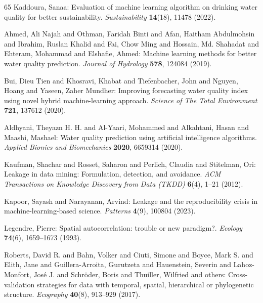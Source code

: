 \documentclass[pdflatex,sn-mathphys-num]{sn-jnl}%
\theoremstyle{thmstyleone}%
\theoremstyle{thmstyletwo}%
\theoremstyle{thmstylethree}%
\begin{document}
\begin{thebibliography}{65}
Kaddoura, Sanaa: Evaluation of machine learning algorithm on drinking water quality for better sustainability.
\textit{Sustainability} \textbf{14}(18), 11478 (2022).

Ahmed, Ali Najah and Othman, Faridah Binti and Afan, Haitham Abdulmohsin and Ibrahim, Ruslan Khalid and Fai, Chow Ming and Hossain, Md. Shahadat and Ehteram, Mohammad and Elshafie, Ahmed: Machine learning methods for better water quality prediction.
\textit{Journal of Hydrology} \textbf{578}, 124084 (2019).

Bui, Dieu Tien and Khosravi, Khabat and Tiefenbacher, John and Nguyen, Hoang and Yaseen, Zaher Mundher: Improving forecasting water quality index using novel hybrid machine-learning approach.
\textit{Science of The Total Environment} \textbf{721}, 137612 (2020).

Aldhyani, Theyazn H. H. and Al-Yaari, Mohammed and Alkahtani, Hasan and Maashi, Mashael: Water quality prediction using artificial intelligence algorithms.
\textit{Applied Bionics and Biomechanics} \textbf{2020}, 6659314 (2020).

Kaufman, Shachar and Rosset, Saharon and Perlich, Claudia and Stitelman, Ori: Leakage in data mining: Formulation, detection, and avoidance.
\textit{ACM Transactions on Knowledge Discovery from Data (TKDD)} \textbf{6}(4), 1--21 (2012).

Kapoor, Sayash and Narayanan, Arvind: Leakage and the reproducibility crisis in machine-learning-based science.
\textit{Patterns} \textbf{4}(9), 100804 (2023).

Legendre, Pierre: Spatial autocorrelation: trouble or new paradigm?.
\textit{Ecology} \textbf{74}(6), 1659--1673 (1993).

Roberts, David R. and Bahn, Volker and Ciuti, Simone and Boyce, Mark S. and Elith, Jane and Guillera-Arroita, Gurutzeta and Hauenstein, Severin and Lahoz-Monfort, Jos{\'e} J. and Schr{\"o}der, Boris and Thuiller, Wilfried and others: Cross-validation strategies for data with temporal, spatial, hierarchical or phylogenetic structure.
\textit{Ecography} \textbf{40}(8), 913--929 (2017).


\end{thebibliography}
\end{document}
